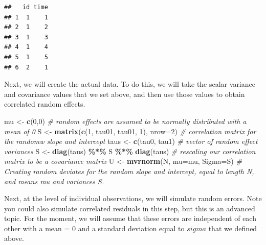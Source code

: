 \documentclass[
]{article}
\newenvironment{Shaded}{\begin{snugshade}}{\end{snugshade}}
\newcommand{\AttributeTok}[1]{\textcolor[rgb]{0.13,0.29,0.53}{#1}}
\newcommand{\CommentTok}[1]{\textcolor[rgb]{0.56,0.35,0.01}{\textit{#1}}}
\newcommand{\DecValTok}[1]{\textcolor[rgb]{0.00,0.00,0.81}{#1}}
\newcommand{\FunctionTok}[1]{\textcolor[rgb]{0.13,0.29,0.53}{\textbf{#1}}}
\newcommand{\NormalTok}[1]{#1}
\newcommand{\OtherTok}[1]{\textcolor[rgb]{0.56,0.35,0.01}{#1}}
\newcommand{\SpecialCharTok}[1]{\textcolor[rgb]{0.81,0.36,0.00}{\textbf{#1}}}
\begin{document}
\begin{verbatim}
##   id time
## 1  1    1
## 2  1    2
## 3  1    3
## 4  1    4
## 5  1    5
## 6  2    1
\end{verbatim}

Next, we will create the actual data. To do this, we will take the
scalar variance and covariance values that we set above, and then use
those values to obtain correlated random effects.

\begin{Shaded}
\begin{Highlighting}[]
\NormalTok{mu  }\OtherTok{\textless{}{-}} \FunctionTok{c}\NormalTok{(}\DecValTok{0}\NormalTok{,}\DecValTok{0}\NormalTok{) }\CommentTok{\# random effects are assumed to be normally distributed with a mean of 0}
\NormalTok{S   }\OtherTok{\textless{}{-}} \FunctionTok{matrix}\NormalTok{(}\FunctionTok{c}\NormalTok{(}\DecValTok{1}\NormalTok{, tau01, tau01, }\DecValTok{1}\NormalTok{), }\AttributeTok{nrow=}\DecValTok{2}\NormalTok{) }\CommentTok{\# correlation matrix for the randomw slope and intercept}
\NormalTok{taus }\OtherTok{\textless{}{-}} \FunctionTok{c}\NormalTok{(tau0, tau1) }\CommentTok{\# vector of random effect variances}
\NormalTok{S   }\OtherTok{\textless{}{-}} \FunctionTok{diag}\NormalTok{(taus) }\SpecialCharTok{\%*\%}\NormalTok{ S }\SpecialCharTok{\%*\%} \FunctionTok{diag}\NormalTok{(taus) }\CommentTok{\# rescaling our correlation matrix to be a covariance matrix}
\NormalTok{U   }\OtherTok{\textless{}{-}} \FunctionTok{mvrnorm}\NormalTok{(N, }\AttributeTok{mu=}\NormalTok{mu, }\AttributeTok{Sigma=}\NormalTok{S) }\CommentTok{\# Creating random deviates for the random slope and intercept, equal to length N, and means mu and variances S.}
\end{Highlighting}
\end{Shaded}

Next, at the level of individual observations, we will simulate random
errors. Note you could also simulate correlated residuals in this step,
but this is an advanced topic. For the moment, we will assume that these
errors are independent of each other with a mean = 0 and a standard
deviation equal to \(sigma\) that we defined above.

\begin{Shaded}
\end{Shaded}
\end{document}

